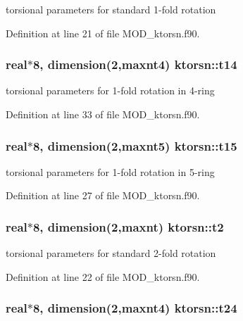 torsional parameters for standard 1-\/fold rotation 



Definition at line 21 of file M\-O\-D\-\_\-ktorsn.\-f90.

\hypertarget{classktorsn_a12d6c1b9173ca22ab13c01fca7e04853}{
\subsubsection[{t14}]{\setlength{\rightskip}{0pt plus 5cm}real$\ast$8, dimension(2,{\bf maxnt4}) ktorsn\-::t14}}\label{classktorsn_a12d6c1b9173ca22ab13c01fca7e04853}


torsional parameters for 1-\/fold rotation in 4-\/ring 



Definition at line 33 of file M\-O\-D\-\_\-ktorsn.\-f90.

\hypertarget{classktorsn_ad57113ae9f68856bf37e9f23d360afc7}{
\subsubsection[{t15}]{\setlength{\rightskip}{0pt plus 5cm}real$\ast$8, dimension(2,{\bf maxnt5}) ktorsn\-::t15}}\label{classktorsn_ad57113ae9f68856bf37e9f23d360afc7}


torsional parameters for 1-\/fold rotation in 5-\/ring 



Definition at line 27 of file M\-O\-D\-\_\-ktorsn.\-f90.

\hypertarget{classktorsn_a0aea1c3f271817692625a530f10a55f6}{
\subsubsection[{t2}]{\setlength{\rightskip}{0pt plus 5cm}real$\ast$8, dimension(2,{\bf maxnt}) ktorsn\-::t2}}\label{classktorsn_a0aea1c3f271817692625a530f10a55f6}


torsional parameters for standard 2-\/fold rotation 



Definition at line 22 of file M\-O\-D\-\_\-ktorsn.\-f90.

\hypertarget{classktorsn_a8f9efc19540fa5cf15d01432d6f0fe57}{
\subsubsection[{t24}]{\setlength{\rightskip}{0pt plus 5cm}real$\ast$8, dimension(2,{\bf maxnt4}) ktorsn\-::t24}}\label{classktorsn_a8f9efc19540fa5cf15d01432d6f0fe57}


